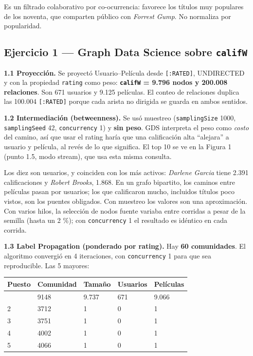 \documentclass[
  spanish,
  10pt,
]{article}
\newcounter{none} %
\begin{document}
Es un filtrado colaborativo por co-ocurrencia: favorece los títulos muy
populares de los noventa, que comparten público con \emph{Forrest Gump}.
No normaliza por popularidad.

\subsection{\texorpdfstring{Ejercicio 1 --- Graph Data Science sobre
\texttt{califW}}{Ejercicio 1 --- Graph Data Science sobre califW}}\label{ejercicio-1-graph-data-science-sobre-califw}

\textbf{1.1 Proyección.} Se proyectó Usuario--Película desde
\texttt{{[}:RATED{]}}, UNDIRECTED y con la propiedad \texttt{rating}
como peso: \textbf{\texttt{califW} = 9.796 nodos y 200.008 relaciones}.
Son 671 usuarios y 9.125 películas. El conteo de relaciones duplica las
100.004 \texttt{{[}:RATED{]}} porque cada arista no dirigida se guarda
en ambos sentidos.

\textbf{1.2 Intermediación (betweenness).} Se usó muestreo
(\texttt{samplingSize} 1000, \texttt{samplingSeed} 42,
\texttt{concurrency} 1) y \textbf{sin peso}. GDS interpreta el peso como
\emph{costo} del camino, así que usar el rating haría que una
calificación alta ``alejara'' a usuario y película, al revés de lo que
significa. El top 10 se ve en la Figura 1 (punto 1.5, modo stream), que
usa esta misma consulta.

Los diez son usuarios, y coinciden con los más activos: \emph{Darlene
Garcia} tiene 2.391 calificaciones y \emph{Robert Brooks}, 1.868. En un
grafo bipartito, los caminos entre películas pasan por usuarios; los que
calificaron mucho, incluidos títulos poco vistos, son los puentes
obligados. Con muestreo los valores son una aproximación. Con varios
hilos, la selección de nodos fuente variaba entre corridas a pesar de la
semilla (hasta un 2 \%); con \texttt{concurrency} 1 el resultado es
idéntico en cada corrida.

\textbf{1.3 Label Propagation (ponderado por rating).} Hay \textbf{60
comunidades}. El algoritmo convergió en 4 iteraciones, con
\texttt{concurrency} 1 para que sea reproducible. Las 5 mayores:

{\def\LTcaptype{none} %
\begin{longtable}[]{@{}lllll@{}}
\toprule\noalign{}
Puesto & Comunidad & Tamaño & Usuarios & Películas \\
\midrule\noalign{}
\endhead
\bottomrule\noalign{}
\endlastfoot
1 & 9148 & 9.737 & 671 & 9.066 \\
2 & 3712 & 1 & 0 & 1 \\
3 & 3751 & 1 & 0 & 1 \\
4 & 4002 & 1 & 0 & 1 \\
5 & 4066 & 1 & 0 & 1 \\
\end{longtable}
}
\end{document}
